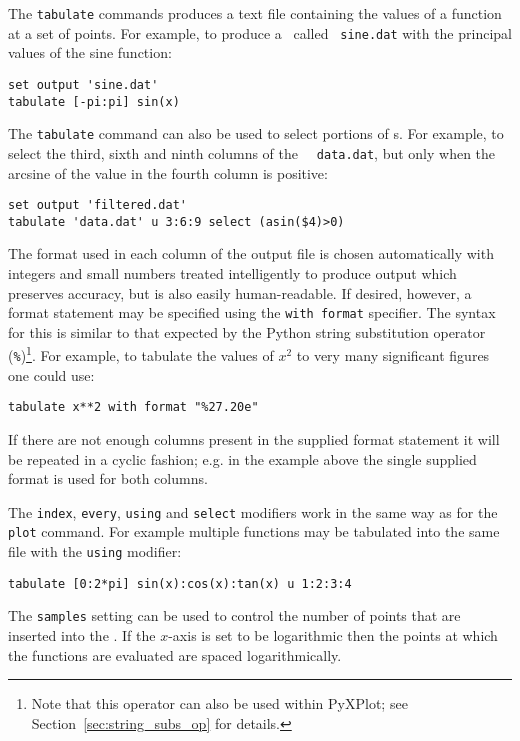 The {\tt tabulate} commands produces a text file containing the values of a
function at a set of points.  For example, to produce a \datafile\ called {\tt
sine.dat} with the principal values of the sine function:

\begin{verbatim}
set output 'sine.dat'
tabulate [-pi:pi] sin(x)
\end{verbatim}

The {\tt tabulate} command can also be used to select portions of \datafile s.
For example, to select the third, sixth and ninth columns of the \datafile\ {\tt
data.dat}, but only when the arcsine of the value in the fourth column is
positive:

\begin{verbatim}
set output 'filtered.dat'
tabulate 'data.dat' u 3:6:9 select (asin($4)>0)
\end{verbatim}

The format used in each column of the output file is chosen automatically with
integers and small numbers treated intelligently to produce output which
preserves accuracy, but is also easily human-readable. If desired, however, a
format statement may be specified using the {\tt with format} specifier. The
syntax for this is similar to that expected by the Python string substitution
operator ({\tt \%})\footnote{Note that this operator can also be used
within PyXPlot; see Section~\ref{sec:string_subs_op} for details.}.  For example,
to tabulate the values of $x^2$ to very many significant figures one could use:

\begin{verbatim}
tabulate x**2 with format "%27.20e"
\end{verbatim}

If there are not enough columns present in the supplied format statement it
will be repeated in a cyclic fashion; e.g. in the example above the single
supplied format is used for both columns.

The {\tt index}, {\tt every}, {\tt using} and {\tt select} modifiers work in the
same way as for the {\tt plot} command.  For example multiple functions may be
tabulated into the same file with the {\tt using} modifier:

\begin{verbatim}
tabulate [0:2*pi] sin(x):cos(x):tan(x) u 1:2:3:4
\end{verbatim}

The {\tt samples} setting can be used to control the number of points that are
inserted into the \datafile.  If the $x$-axis is set to be logarithmic then the
points at which the functions are evaluated are spaced logarithmically.


